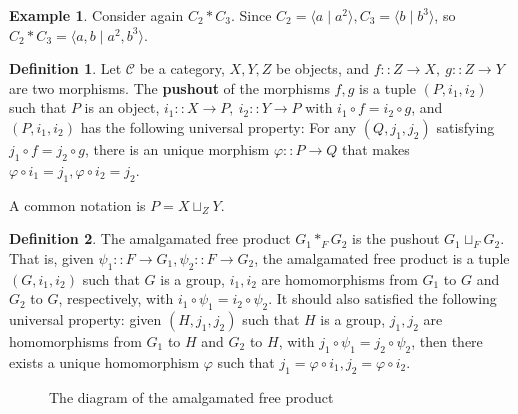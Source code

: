 \documentclass[a4paper,titlepage]{article}
\theoremstyle{remark}
\theoremstyle{definition}
\newtheorem{example}{Example}
\theoremstyle{definition}
\newtheorem{definition}{Definition}
\theoremstyle{plain}
\begin{document}
  \begin{example}
    Consider again $C_2 \ast C_3$. Since $C_2 = \langle a \mid a^2 \rangle, C_3 = \langle b \mid b^3 \rangle$,
    so $C_2 \ast C_3 = \langle a, b \mid a^2, b^3 \rangle$.
  \end{example}

  \begin{definition}
    Let $\mathcal{C}$ be a category, $X, Y, Z$ be objects, and $f :: Z \to X,\ g :: Z \to Y$ are
    two morphisms. The {\bf pushout} of the morphisms $f, g$ is a tuple $(P, i_1, i_2)$ such
    that $P$ is an object, $i_1 :: X \to P,\ i_2 :: Y \to P$ with $i_1 \circ f = i_2 \circ g$,
    and $(P, i_1, i_2)$ has the following universal property: 
    For any $(Q, j_1, j_2)$ satisfying $j_1 \circ f = j_2 \circ g$, there is an unique morphism 
    $\varphi :: P \to Q$ that makes $\varphi \circ i_1 = j_1, \varphi \circ i_2 = j_2$.
    
    A common notation is $P = X \sqcup_{Z} Y$.
  \end{definition}

  \begin{definition}
    The amalgamated free product $G_1 \ast_F G_2$ is the pushout $G_1 \sqcup_{F} G_2$. That
    is, given $\psi_1 :: F \to G_1, \psi_2 :: F \to G_2$, the amalgamated free product is a tuple
    $(G, i_1, i_2)$ such that $G$ is a group, $i_1, i_2$ are homomorphisms from $G_1$ to $G$ and
    $G_2$ to $G$, respectively, with $i_1 \circ \psi_1 = i_2 \circ \psi_2$. It should also satisfied
    the following universal property: given $(H, j_1, j_2)$ such that $H$ is a group,
    $j_1, j_2$ are homomorphisms from $G_1$ to $H$ and $G_2$ to
    $H$, with $j_1 \circ \psi_1 = j_2 \circ \psi_2$, then there exists a unique homomorphism
    $\varphi$ such that $j_1 = \varphi \circ i_1, j_2 = \varphi \circ i_2$.
  \end{definition}

  \begin{figure}[h]
    \centering
    \caption{The diagram of the amalgamated free product}
  \end{figure}
\end{document}
